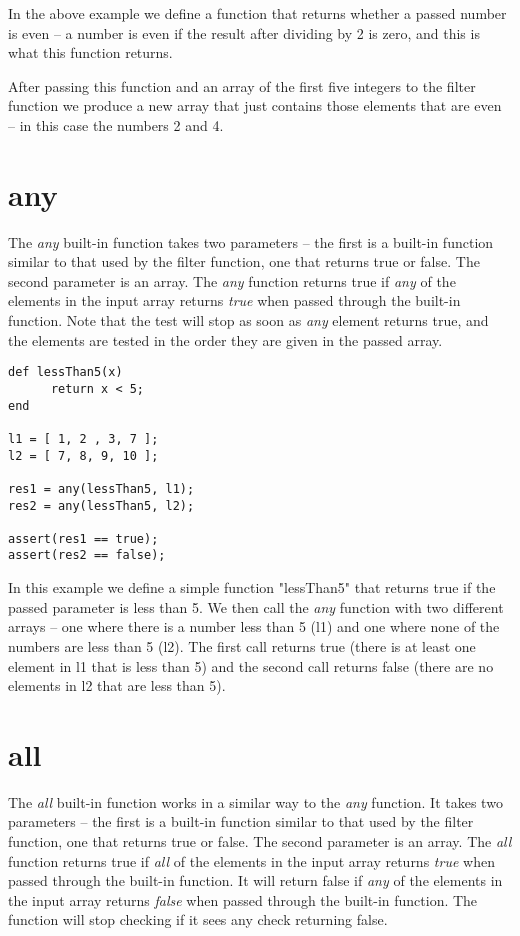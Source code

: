 In the above example we define a function that returns whether a passed number is even -- a number is even if the result after dividing by 2 is zero, and this is what this function returns.

After passing this function and an array of the first five integers to the filter function we produce a new array that just contains those elements that are even -- in this case the numbers 2 and 4.

\section{any}
The \emph{any} built-in function takes two parameters -- the first is a built-in function similar to that used by the filter function, one that returns true or false. The second parameter is an array. The \emph{any} function returns true if \emph{any} of the elements in the input array returns \emph{true} when passed through the built-in function. Note that the test will stop as soon as \emph{any} element returns true, and the elements are tested in the order they are given in the passed array.

\begin{lstlisting}[caption={Reflex any function}]
def lessThan5(x)
      return x < 5;
end

l1 = [ 1, 2 , 3, 7 ];
l2 = [ 7, 8, 9, 10 ];

res1 = any(lessThan5, l1);
res2 = any(lessThan5, l2);

assert(res1 == true);
assert(res2 == false);
\end{lstlisting}

In this example we define a simple function "lessThan5" that returns true if the passed parameter is less than 5. We then call the \emph{any} function with two different arrays -- one where there is a number less than 5 (l1) and one where none of the numbers are less than 5 (l2). The first call returns true (there is at least one element in l1 that is less than 5) and the second call returns false (there are no elements in l2 that are less than 5).

\section{all}
The \emph{all} built-in function works in a similar way to the \emph{any} function. It takes two parameters -- the first is a built-in function similar to that used by the filter function, one that returns true or false. The second parameter is an array. The \emph{all} function returns true if \emph{all} of the elements in the input array returns \emph{true} when passed through the built-in function. It will return false if \emph{any} of the elements in the input array returns \emph{false} when passed through the built-in function. The function will stop checking if it sees any check returning false. 

